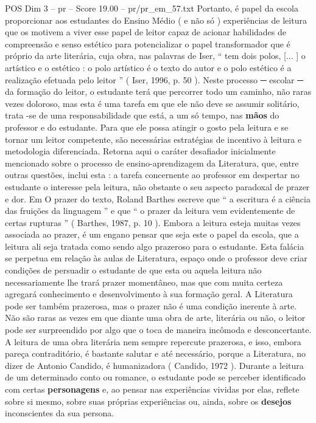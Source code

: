 \begin{textsample}{POS Dim 3 – pr – Score 19.00 – pr/pr\_em\_57.txt}
Portanto, é papel da escola proporcionar aos estudantes do Ensino Médio ( e não só ) experiências de leitura que os motivem a viver esse papel de leitor capaz de acionar habilidades de compreensão e senso estético para potencializar o papel transformador que é próprio da arte literária, cuja obra, nas palavras de Iser, “ tem dois polos, [... ] o artístico e o estético : o polo artístico é o texto do autor e o polo estético é a realização efetuada pelo leitor ” ( Iser, 1996, p. 50 ).
Neste processo {\EmojiFont ─} escolar {\EmojiFont ─} da formação do leitor, o estudante terá que percorrer todo um caminho, não raras vezes doloroso, mas esta é uma tarefa em que ele não deve se assumir solitário, trata -se de uma responsabilidade que está, a um só tempo, nas \textbf{mãos} do professor e do estudante.
Para que ele possa atingir o gosto pela leitura e se tornar um leitor competente, são necessárias estratégias de incentivo à leitura e metodologia diferenciada.
Retorna aqui o caráter desafiador inicialmente mencionado sobre o processo de ensino-aprendizagem da Literatura, que, entre outras questões, inclui esta : a tarefa concernente ao professor em despertar no estudante o interesse pela leitura, não obstante o seu aspecto paradoxal de prazer e dor.
Em O prazer do texto, Roland Barthes escreve que “ a escritura é a ciência das fruições da linguagem ” e que “ o prazer da leitura vem evidentemente de certas rupturas ” ( Barthes, 1987, p. 10 ).
Embora a leitura esteja muitas vezes associada ao prazer, é um engano pensar que seja este o papel da escola, que a leitura ali seja tratada como sendo algo prazeroso para o estudante.
Esta falácia se perpetua em relação às aulas de Literatura, espaço onde o professor deve criar condições de persuadir o estudante de que esta ou aquela leitura não necessariamente lhe trará prazer momentâneo, mas que com muita certeza agregará conhecimento e desenvolvimento à sua formação geral.
A Literatura pode ser também prazerosa, mas o prazer não é uma condição inerente à arte.
Não são raras as vezes em que diante uma obra de arte, literária ou não, o leitor pode ser surpreendido por algo que o toca de maneira incômoda e desconcertante.
A leitura de uma obra literária nem sempre repercute prazerosa, e isso, embora pareça contraditório, é bastante salutar e até necessário, porque a Literatura, no dizer de Antonio Candido, é humanizadora ( Candido, 1972 ).
Durante a leitura de um determinado conto ou romance, o estudante pode se perceber identificado com certas \textbf{personagens} e, ao pensar nas experiências vividas por elas, reflete sobre si mesmo, sobre suas próprias experiências ou, ainda, sobre os \textbf{desejos} inconscientes da sua persona.

\end{textsample}
